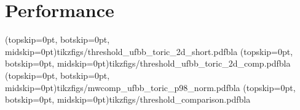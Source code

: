 \section{Performance}\label{sec:performance}




\Figure[htb](topskip=0pt, botskip=0pt, midskip=0pt){tikzfigs/threshold_ufbb_toric_2d_short.pdf}{bla\label{ufbb_short}}
\Figure[htb](topskip=0pt, botskip=0pt, midskip=0pt){tikzfigs/threshold_ufbb_toric_2d_comp.pdf}{bla\label{ufbb_comp}}
\Figure[htb](topskip=0pt, botskip=0pt, midskip=0pt){tikzfigs/mwcomp_ufbb_toric_p98_norm.pdf}{bla\label{mwcomp}}
\Figure[htb](topskip=0pt, botskip=0pt, midskip=0pt){tikzfigs/threshold_comparison.pdf}{bla\label{thres_comp}}
